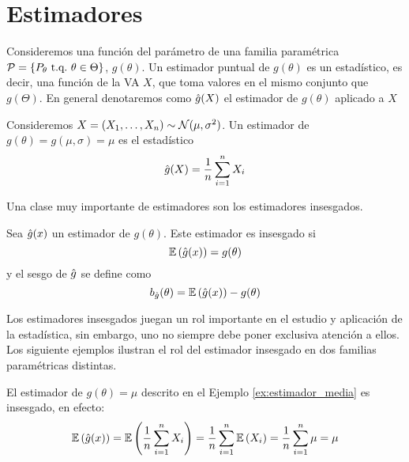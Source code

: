 

\chapter{Estimadores}

Consideremos una función del parámetro de una familia paramétrica $\mathcal{P} = \{P_\theta\ {\text{t.q.}}\ \theta\in\Theta\}$, $g(\theta)$.  Un estimador puntual de $g(\theta)$ es un estadístico, es decir, una función de la VA $X$, que toma valores en el mismo conjunto que $g(\Theta)$. En general denotaremos como ${ \hat{g}}(X)$ el estimador de $g(\theta)$ aplicado a $X$ 


\begin{example}
	\label{ex:estimador_media}
	Consideremos $X = (X_1,\ldots,X_n)\sim{\mathcal N}(\mu,\sigma^2)$. Un estimador de $g(\theta) = g(\mu,\sigma) = \mu$ es el estadístico 
	\begin{equation}
		{ \hat{g}}(X) = \frac{1}{n}\sum_{i=1}^nX_i
	\end{equation} 
\end{example}

Una clase muy importante de estimadores son los estimadores insesgados. 

\begin{definition}
	\label{def:estimador_insesgado}
	Sea ${ \hat{g}(x)}$ un estimador de $g(\theta)$. Este estimador es insesgado si 
	\begin{equation}
		\mathbb{E} \left({ \hat{g}(x)}\right) = g(\theta)
	\end{equation}
	y el sesgo de ${ \hat{g}}$ se define como 
	\begin{equation}
		b_{ \hat{g}}(\theta) = \mathbb{E} \left({ \hat{g}(x)}\right) - g(\theta)
	\end{equation}
\end{definition}



Los estimadores insesgados juegan un rol importante en el estudio y aplicación de la estadística, sin embargo, uno no siempre debe poner exclusiva atención a ellos. Los siguiente ejemplos ilustran el rol del estimador insesgado en dos familias paramétricas distintas. 

\begin{example}
	\label{ex:estimador_in_media}
	El estimador de $g(\theta) =  \mu$ descrito en el Ejemplo \ref{ex:estimador_media} es insesgado, en efecto: 
	\begin{equation}
		\mathbb{E} \left({ \hat{g}(x)}\right) = \mathbb{E} \left(\frac{1}{n}\sum_{i=1}^nX_i\right)	= \frac{1}{n}\sum_{i=1}^n\mathbb{E} \left(X_i\right)		= \frac{1}{n}\sum_{i=1}^n\mu = \mu	
	\end{equation}
\end{example}


